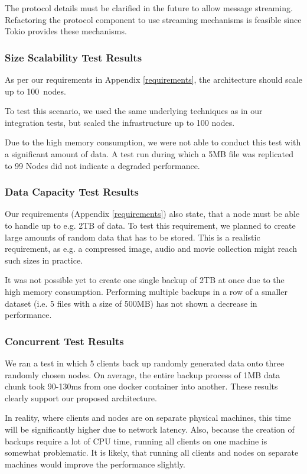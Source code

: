 The protocol details must be clarified in the future to allow \gls{message} streaming. Refactoring the protocol component to use streaming mechanisms is feasible since Tokio provides these mechanisms\cite{tokio-streaming}. 

\subsubsection{Size Scalability Test Results}
As per our requirements in Appendix \ref{requirements}, the architecture should scale up to 100~\glspl{node}.

To test this scenario, we used the same underlying techniques as in our integration tests, but scaled the infrastructure up to 100 \glspl{node}.

Due to the high memory consumption, we were not able to conduct this test with a significant amount of data. A test run during which a 5MB file was replicated to 99 Nodes did not indicate a degraded performance.

\subsubsection{Data Capacity Test Results}
Our requirements (Appendix \ref{requirements}) also state, that a \gls{node} must be able to handle up to e.g. 2TB of data. To test this requirement, we planned to create large amounts of random data that has to be stored. This is a realistic requirement, as e.g. a compressed image, audio and movie collection might reach such sizes in practice.

It was not possible yet to create one single backup of 2TB at once due to the high memory consumption. Performing multiple backups in a row of a smaller dataset (i.e. 5 files with a size of 500MB) has not shown a decrease in performance.

\subsubsection{Concurrent Test Results}

We ran a test in which 5 \glspl{client} back up randomly generated data onto three randomly chosen \glspl{node}. On average, the entire backup process of 1MB data \gls{chunk} took 90-130ms from one docker container into another. These results clearly support our proposed architecture.

In reality, where \glspl{client} and \glspl{node} are on separate physical machines, this time will be significantly higher due to network latency. Also, because the creation of backups require a lot of CPU time, running all \glspl{client} on one machine is somewhat problematic. It is likely, that running all \glspl{client} and \glspl{node} on separate machines would improve the performance slightly.

